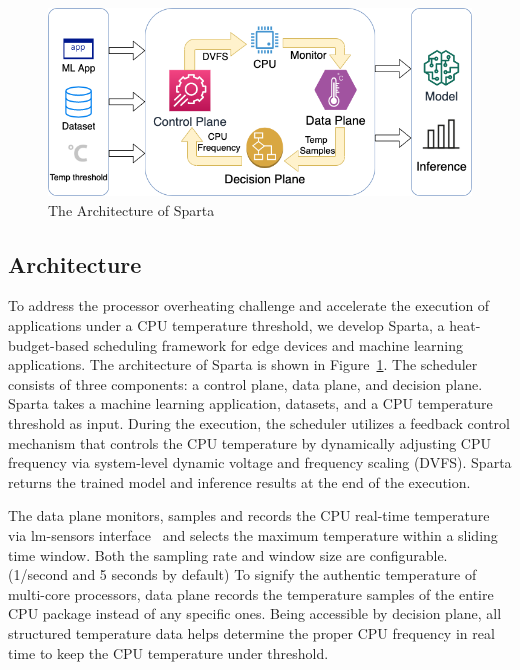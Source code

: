 \begin{figure}[ht]
\includegraphics[width=\textwidth]{figures/Sparta.png}
\caption{The Architecture of Sparta} \label{fig:sparta}
\end{figure}

\subsection{Architecture}

To address the processor overheating challenge and accelerate the execution of applications under a CPU temperature threshold, we develop Sparta, a heat-budget-based scheduling framework for edge devices and machine learning applications. The architecture of Sparta is shown in Figure~\ref{fig:sparta}. The scheduler consists of three components: a control plane, data plane, and decision plane. Sparta takes a machine learning application, datasets, and a CPU temperature threshold as input. During the execution, the scheduler utilizes a feedback control mechanism that controls the CPU temperature by dynamically adjusting CPU frequency via system-level dynamic voltage and frequency scaling (DVFS). Sparta returns the trained model and inference results at the end of the execution. 


The data plane
monitors, samples and records the CPU real-time temperature via lm-sensors interface~\cite{ref:sensors} and selects the maximum temperature within a sliding time window. Both the sampling rate and window size are configurable. (1/second and 5 seconds by default) To signify the authentic temperature of multi-core processors, data plane records the temperature samples of the entire CPU package instead of any specific ones. Being accessible by decision plane, all structured temperature data helps determine the proper CPU frequency in real time to keep the CPU temperature under threshold.

